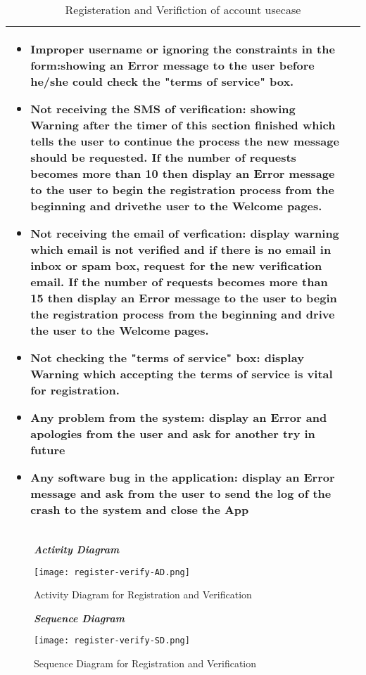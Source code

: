 \begin{table}[H]
\begin{tabulary}{\textwidth}{|J|J|}
\begin{minipage}[t]{0.6\textwidth}
\begin{itemize}
\item Improper username or ignoring the constraints in the form:showing an Error message to the user before he/she could check the "terms of service" box.
\item Not receiving the SMS of verification: showing Warning after the timer of this section finished which tells the user to continue the process the new message should be requested. If the number of requests becomes more than 10 then display an Error message to the user to begin the registration process from the beginning and drivethe user to the Welcome pages.
\item Not receiving the email of verfication: display warning which email is not verified and if there is no email in inbox or spam box, request for the new verification email. If the number of requests becomes more than 15 then display an Error message to the user to begin the registration process from the beginning and drive the user to the Welcome pages.
\item Not checking the "terms of service" box: display Warning which accepting the terms of service is vital for registration.
\item Any problem from the system: display an Error and apologies from the user and ask for another try in future
\item Any software bug in the application: display an Error message and ask from the user to send the log of the crash to the system and close the App
\end{itemize}
\end{minipage}\\
\hline
\end{tabulary}
\caption{\label{tab:Register-Verify-account}Registeration and Verifiction of account usecase}
\end{table}

\begin{figure}[H]
\begin{flushleft}\emph{\textbf{Activity Diagram}}\end{flushleft}
\caption{Activity Diagram for Registration and Verification}
\label{register-verify-AD}
\centering
\texttt{[image: register-verify-AD.png]}
\end{figure}

\begin{figure}[H]
\begin{flushleft}\emph{\textbf{Sequence Diagram}}\end{flushleft}
\caption{Sequence Diagram for Registration and Verification}
\label{fig:register-verify-SD}
\centering
\texttt{[image: register-verify-SD.png]}
\end{figure}

